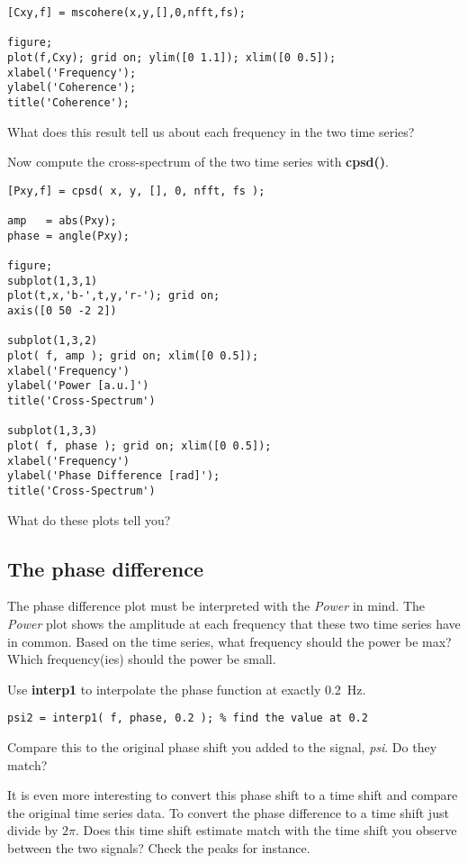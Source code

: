 \documentclass[10pt,fleqn]{article}
\begin{document}
\begin{lstlisting}
[Cxy,f] = mscohere(x,y,[],0,nfft,fs);

figure;
plot(f,Cxy); grid on; ylim([0 1.1]); xlim([0 0.5]);
xlabel('Frequency');
ylabel('Coherence');
title('Coherence');
\end{lstlisting}
What does this result tell us about each frequency in the two time series?


Now compute the cross-spectrum of the two time series with \textbf{cpsd()}. 
\begin{lstlisting}
[Pxy,f] = cpsd( x, y, [], 0, nfft, fs );

amp   = abs(Pxy);
phase = angle(Pxy);

figure;
subplot(1,3,1)
plot(t,x,'b-',t,y,'r-'); grid on;
axis([0 50 -2 2])

subplot(1,3,2)
plot( f, amp ); grid on; xlim([0 0.5]);
xlabel('Frequency')
ylabel('Power [a.u.]')
title('Cross-Spectrum')

subplot(1,3,3)
plot( f, phase ); grid on; xlim([0 0.5]);
xlabel('Frequency')
ylabel('Phase Difference [rad]');
title('Cross-Spectrum')
\end{lstlisting}

What do these plots tell you?

\subsection*{The phase difference}

The phase difference plot must be interpreted with the \textit{Power} in mind. The \textit{Power} plot shows the amplitude at each frequency that these two time series have in common. Based on the time series, what frequency should the power be max? Which frequency(ies) should the power be small.

Use \textbf{interp1} to interpolate the phase function at exactly 0.2~Hz.
\begin{lstlisting}
psi2 = interp1( f, phase, 0.2 ); % find the value at 0.2
\end{lstlisting}
Compare this to the original phase shift you added to the signal, \textit{psi}. Do they match?

It is even more interesting to convert this phase shift to a time shift and compare the original time series data. To convert the phase difference to a time shift just divide by $2\pi$. Does this time shift estimate match with the time shift you observe between the two signals? Check the peaks for instance.
\end{document}
